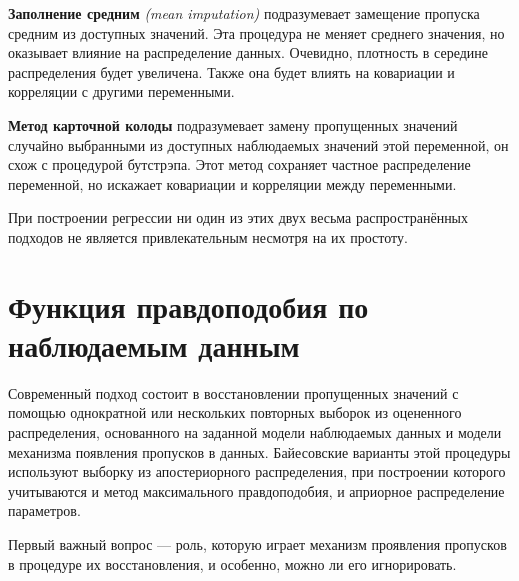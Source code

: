 {\bf Заполнение средним} \emph{(mean imputation)} подразумевает замещение пропуска средним из доступных значений. Эта процедура не меняет среднего значения, но оказывает влияние на распределение данных. Очевидно, плотность в середине распределения будет увеличена. Также она будет влиять на ковариации и корреляции с другими переменными.

{\bf Метод карточной колоды} подразумевает замену пропущенных значений случайно выбранными из доступных наблюдаемых значений этой переменной, он схож с процедурой бутстрэпа. Этот метод сохраняет частное распределение переменной, но искажает ковариации и корреляции между переменными. 

При построении регрессии ни один из этих двух весьма распространённых подходов не является привлекательным несмотря на их простоту.

\section{Функция правдоподобия по наблюдаемым данным} 

Современный подход  состоит в восстановлении пропущенных значений с помощью однократной или нескольких повторных выборок из  оцененного распределения, основанного на заданной модели наблюдаемых данных и модели механизма появления пропусков в данных. Байесовские варианты этой процедуры используют выборку из апостериорного распределения, при построении которого учитываются и метод максимального правдоподобия, и априорное распределение параметров.

Первый важный вопрос --- роль, которую играет механизм проявления пропусков в процедуре их восстановления, и особенно, можно ли его игнорировать.

